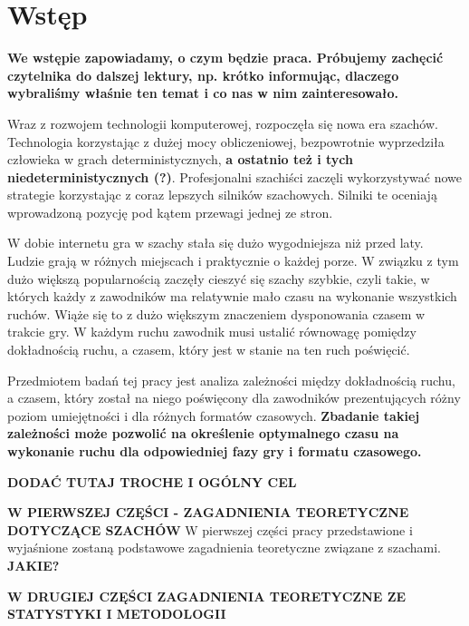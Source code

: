 \documentclass[inzynierska]{pwr_wmat_praca_dyplomowa}
\theoremstyle{plain}
\numberwithin{theorem}{chapter}
\theoremstyle{definition}
\numberwithin{theorem}{chapter}
\begin{document}

\frontmatter
\maketitle
\mainmatter
\tableofcontents

{\backmatter \chapter{Wstęp}}
\textbf{We wstępie zapowiadamy, o czym będzie praca. Próbujemy zachęcić czytelnika do dalszej lektury, np. krótko informując, dlaczego wybraliśmy właśnie ten temat i co nas w nim zainteresowało.}

Wraz z rozwojem technologii komputerowej, rozpoczęła się nowa era szachów. Technologia korzystając z dużej mocy obliczeniowej, bezpowrotnie wyprzedziła człowieka w grach deterministycznych,\textbf{ a ostatnio też i tych niedeterministycznych (?)}. Profesjonalni szachiści zaczęli wykorzystywać nowe strategie korzystając z coraz lepszych silników szachowych. Silniki te oceniają wprowadzoną pozycję pod kątem przewagi jednej ze stron. 

W dobie internetu gra w szachy stała się dużo wygodniejsza niż przed laty. Ludzie grają w różnych miejscach i praktycznie o każdej porze. W związku z tym dużo większą popularnością zaczęły cieszyć się szachy szybkie, czyli takie, w których każdy z zawodników ma relatywnie mało czasu na wykonanie wszystkich ruchów. Wiąże się to z dużo większym znaczeniem dysponowania czasem w trakcie gry. W każdym ruchu zawodnik musi ustalić równowagę pomiędzy dokładnością ruchu, a czasem, który jest w stanie na ten ruch poświęcić. 

Przedmiotem badań tej pracy jest analiza zależności między dokładnością ruchu, a czasem, który został na niego poświęcony dla zawodników prezentujących różny poziom umiejętności i dla różnych formatów czasowych.\textbf{ Zbadanie takiej zależności może pozwolić na określenie optymalnego czasu na wykonanie ruchu dla odpowiedniej fazy gry i formatu czasowego.}

\textbf{DODAĆ TUTAJ TROCHE I OGÓLNY CEL}

\textbf{W PIERWSZEJ CZĘŚCI - ZAGADNIENIA TEORETYCZNE DOTYCZĄCE SZACHÓW}
W pierwszej części pracy przedstawione i wyjaśnione zostaną podstawowe zagadnienia teoretyczne związane z szachami. \textbf{JAKIE?}

\textbf{W DRUGIEJ CZĘŚCI ZAGADNIENIA TEORETYCZNE ZE STATYSTYKI I METODOLOGII}
 
\end{document}
